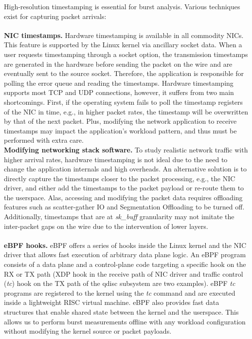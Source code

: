 High-resolution timestamping is essential for burst analysis. Various techniques exist for capturing packet arrivals:
\\
\\
\textbf{NIC timestamps.}
Hardware timestamping is available in all commodity NICs. This feature  is supported by the Linux kernel via ancillary socket data. When a user requests timestamping through a socket option, the transmission timestamps are generated in the hardware before sending the packet on the wire and are eventually sent to the source socket. Therefore, the application is responsible for polling the error queue and reading the timestamps.
Hardware timestamping supports most TCP and UDP connections, however, it suffers from two main shortcomings.
First, if the operating system fails to poll the timestamp registers of the NIC in time, e.g., in higher packet rates, the timestamp will be overwritten by that of the next packet.
Plus, modifying the network application to receive timestamps may impact the application's workload pattern, and thus must be performed with extra care.
\\
\textbf{Modifying networking stack software.}
To study realistic network traffic with higher arrival rates, hardware timestamping is not ideal due to the need to change the application internals and high overheads. An alternative solution is to directly capture the timestamps closer to the packet processing, e.g., the NIC driver, and either add the timestamps to the packet payload or re-route them to the userspace. Alas, accessing and modifying the packet data requires offloading features such as scatter-gather IO and Segmentation Offloading to be turned off. Additionally, timestamps that are at \textit{sk\_buff} granularity may not imitate the inter-packet gaps on the wire due to the intervention of lower layers.
\\
\\
\textbf{eBPF hooks.}
eBPF offers a series of hooks inside the Linux kernel and the NIC driver that allows fast execution of arbitrary data plane logic. An eBPF program consists of a data plane and a control-plane code targeting a specific hook on the RX or TX path (XDP hook in the receive path of NIC driver and traffic control (\textit{tc}) hook on the TX path of the qdisc subsystem are two examples). eBPF \textit{tc} programs are registered to the kernel using the \textit{tc} command and are executed inside a lightweight RISC virtual machine. eBPF also provides fast data structures that enable shared state between the kernel and the userspace. This allows us to perform burst measurements offline with any workload configuration without modifying the kernel source or packet payloads.

